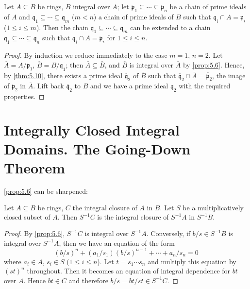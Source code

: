 \begin{theorem}\label{thm:5.11}
Let $A \subseteq B$ be rings, $B$ integral over $A$; let $\mathfrak{p}_1 \subseteq \cdots \subseteq \mathfrak{p}_n$ be a chain of prime ideals of $A$ and $\mathfrak{q}_1 \subseteq \cdots \subseteq \mathfrak{q}_m$ ($m < n$) a chain of prime ideals of $B$ such that $\mathfrak{q}_i \cap A = \mathfrak{p}_i$ ($1 \leq i \leq m$). Then the chain $\mathfrak{q}_1 \subseteq \cdots \subseteq \mathfrak{q}_m$ can be extended to a chain $\mathfrak{q}_1 \subseteq \cdots \subseteq \mathfrak{q}_n$ such that $\mathfrak{q}_i \cap A = \mathfrak{p}_i$ for $1 \leq i \leq n$.
\end{theorem}

\begin{proof}
By induction we reduce immediately to the case $m = 1$, $n = 2$. Let $\overline{A} = A/\mathfrak{p}_1$, $\overline{B} = B/\mathfrak{q}_1$; then $\overline{A} \subseteq \overline{B}$, and $\overline{B}$ is integral over $\overline{A}$ by \eqref{prop:5.6}. Hence, by \eqref{thm:5.10}, there exists a prime ideal $\overline{\mathfrak{q}}_2$ of $\overline{B}$ such that $\overline{\mathfrak{q}}_2 \cap \overline{A} = \overline{\mathfrak{p}}_2$, the image of $\mathfrak{p}_2$ in $\overline{A}$. Lift back $\overline{\mathfrak{q}}_2$ to $B$ and we have a prime ideal $\mathfrak{q}_2$ with the required properties.
\end{proof}

\section*{Integrally Closed Integral Domains. The Going-Down Theorem}

\eqref{prop:5.6} can be sharpened:

\begin{proposition}\label{prop:5.12}
Let $A \subseteq B$ be rings, $C$ the integral closure of $A$ in $B$. Let $S$ be a multiplicatively closed subset of $A$. Then $S^{-1}C$ is the integral closure of $S^{-1}A$ in $S^{-1}B$.
\end{proposition}

\begin{proof}
By \eqref{prop:5.6}, $S^{-1}C$ is integral over $S^{-1}A$. Conversely, if $b/s \in S^{-1}B$ is integral over $S^{-1}A$, then we have an equation of the form
\[
(b/s)^n + (a_1/s_1)(b/s)^{n-1} + \cdots + a_n/s_n = 0
\]
where $a_i \in A$, $s_i \in S$ ($1 \leq i \leq n$). Let $t = s_1 \cdots s_n$ and multiply this equation by $(st)^n$ throughout. Then it becomes an equation of integral dependence for $bt$ over $A$. Hence $bt \in C$ and therefore $b/s = bt/st \in S^{-1}C$.
\end{proof}

